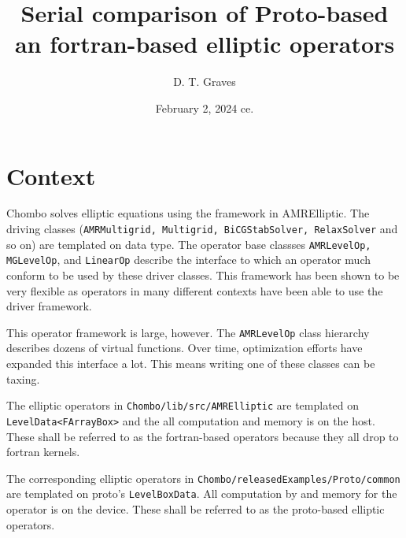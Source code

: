 \documentclass{article}
\begin{document}
\title{Serial comparison of Proto-based an fortran-based elliptic operators}
\author{D. T. Graves   }
\date{February 2, 2024 ce.}

\maketitle


\section{Context}

Chombo solves elliptic equations using the framework in AMRElliptic.
The driving classes ({\tt AMRMultigrid, Multigrid, BiCGStabSolver,
  RelaxSolver} and so on) are templated on data type.  The operator
base classses {\tt AMRLevelOp, MGLevelOp}, and {\tt LinearOp} describe
the interface to which an operator much conform to be used by these
driver classes.    This framework has been shown to be very flexible
as operators in many different contexts have been able to use the
driver framework.

This operator framework is large, however.   The {\tt AMRLevelOp}
class hierarchy describes dozens of virtual functions.    Over time,
optimization efforts have expanded this interface a lot.  This means
writing  one of these classes can be taxing.

The elliptic operators in {\tt Chombo/lib/src/AMRElliptic}
are templated on  {\tt LevelData<FArrayBox>} and the all computation
and memory is on the host.   These shall be referred to as the
fortran-based  operators because they all drop to fortran kernels.

The corresponding elliptic operators in {\tt  Chombo/releasedExamples/Proto/common}
are templated on proto's {\tt LevelBoxData}.   All computation by and
memory for the operator is  on the device.  These shall be referred to
as the proto-based elliptic operators.
\end{document}
